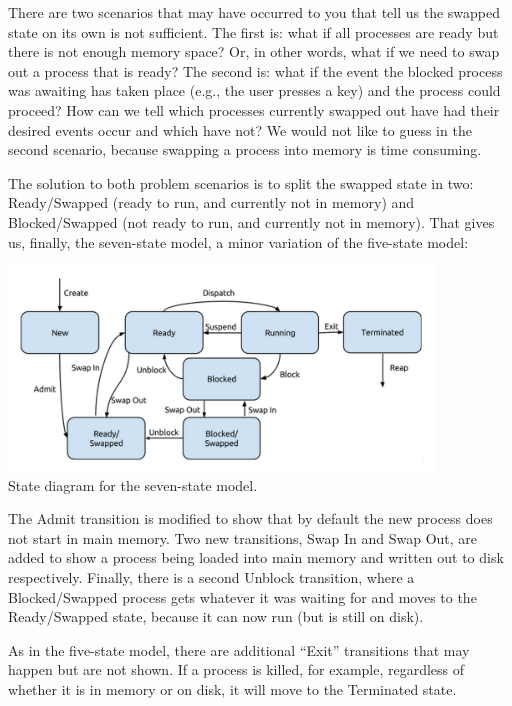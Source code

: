 There are two scenarios that may have occurred to you that tell us the swapped state on its own is not sufficient. The first is: what if all processes are ready but there is not enough memory space? Or, in other words, what if we need to swap out a process that is ready? The second is: what if the event the blocked process was awaiting has taken place (e.g., the user presses a key) and the process could proceed? How can we tell which processes currently swapped out have had their desired events occur and which have not? We would not like to guess in the second scenario, because swapping a process into memory is time consuming.

The solution to both problem scenarios is to split the swapped state in two: Ready/Swapped (ready to run, and currently not in memory) and Blocked/Swapped (not ready to run, and currently not in memory). That gives us, finally, the seven-state model, a minor variation of the five-state model:

\begin{center}
\includegraphics[width=0.85\textwidth]{images/7-state-model.png}\\
State diagram for the seven-state model.
\end{center}

The Admit transition is modified to show that by default the new process does not start in main memory. Two new transitions, Swap In and Swap Out, are added to show a process being loaded into main memory and written out to disk respectively. Finally, there is a second Unblock transition, where a Blocked/Swapped process gets whatever it was waiting for and moves to the Ready/Swapped state, because it can now run (but is still on disk).

As in the five-state model, there are additional ``Exit'' transitions that may happen but are not shown. If a process is killed, for example, regardless of whether it is in memory or on disk, it will move to the Terminated state.




